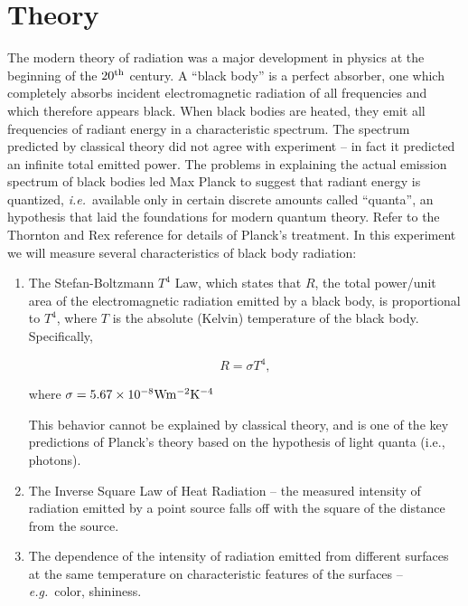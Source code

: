 \section{Theory}


The modern theory of radiation was a major development in physics at the
beginning of the $20^{\rm th}$ century. A
``black body'' is a perfect
absorber, one which completely absorbs incident electromagnetic
radiation of all frequencies and which therefore appears black. When
black bodies are heated, they emit all frequencies of radiant energy in
a characteristic spectrum.  The spectrum predicted by classical theory
did not agree with experiment -- in fact it predicted an infinite total
emitted power.  The problems in explaining the actual emission
spectrum of black bodies led Max Planck to suggest that radiant energy
is quantized, {\em i.e.}\ available only in certain discrete amounts called
``quanta'', an hypothesis that laid
the foundations for modern quantum theory.  Refer to the Thornton and Rex
reference for details of Planck's treatment.  In this experiment we will measure several characteristics of black
body radiation:

\begin{enumerate}
\item The Stefan-Boltzmann $T^4$ Law, which states
that $R$, the total power/unit area of the electromagnetic radiation
emitted by a black body, is proportional to $T^4$, where
$T$ is the absolute (Kelvin) temperature of the black body. Specifically,

\begin{equation}
\label{eq:stephan-boltzman}
R = \sigma T^4, 
 \end{equation}

where $\sigma = 5.67 \times 10^{-8 } {\rm W} {\rm m}^{-2} {\rm K}^{-4}$

This behavior cannot be explained by classical theory, and is one of the
key predictions of Planck's theory based on the
hypothesis of light quanta (i.e., photons).


\item The Inverse Square Law of Heat Radiation -- the measured intensity
of radiation emitted by a point source falls off with the square of the distance from the
source.




\item The dependence of the intensity of radiation emitted from
different surfaces at the same temperature on characteristic features of the surfaces -- {\em e.g.}\ color, shininess.
\end{enumerate}

